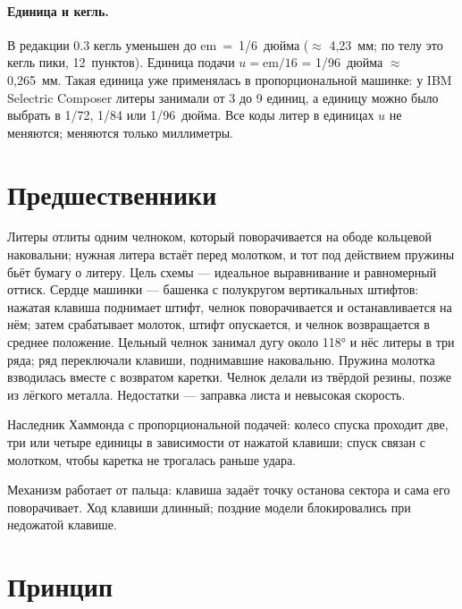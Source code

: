 \paragraph{Единица и кегль.} В редакции 0.3 кегль уменьшен до em~=~1/6~дюйма ($\approx$ 4,23~мм; по телу это кегль пики, 12~пунктов). Единица подачи $u = \mathrm{em}/16$ = 1/96~дюйма $\approx$ 0,265~мм. Такая единица уже применялась в пропорциональной машинке: у IBM Selectric Composer литеры занимали от 3 до 9 единиц, а единицу можно было выбрать в 1/72, 1/84 или 1/96~дюйма. Все коды литер в единицах $u$ не меняются; меняются только миллиметры.

\section{Предшественники}

\begin{description}[style=nextline,leftmargin=0pt]
  \item[Хаммонд (1880-е).] Литеры отлиты одним челноком, который поворачивается на ободе кольцевой наковальни; нужная литера встаёт перед молотком, и тот под действием пружины бьёт бумагу о литеру. Цель схемы — идеальное выравнивание и равномерный оттиск. Сердце машинки — башенка с полукругом вертикальных штифтов: нажатая клавиша поднимает штифт, челнок поворачивается и останавливается на нём; затем срабатывает молоток, штифт опускается, и челнок возвращается в среднее положение. Цельный челнок занимал дугу около 118° и нёс литеры в три ряда; ряд переключали клавиши, поднимавшие наковальню. Пружина молотка взводилась вместе с возвратом каретки. Челнок делали из твёрдой резины, позже из лёгкого металла. Недостатки — заправка листа и невысокая скорость.
  \item[Varityper.] Наследник Хаммонда с пропорциональной подачей: колесо спуска проходит две, три или четыре единицы в зависимости от нажатой клавиши; спуск связан с молотком, чтобы каретка не трогалась раньше удара.
  \item[Комптометр (1887).] Механизм работает от пальца: клавиша задаёт точку останова сектора и сама его поворачивает. Ход клавиши длинный; поздние модели блокировались при недожатой клавише.
\end{description}

\section{Принцип}

